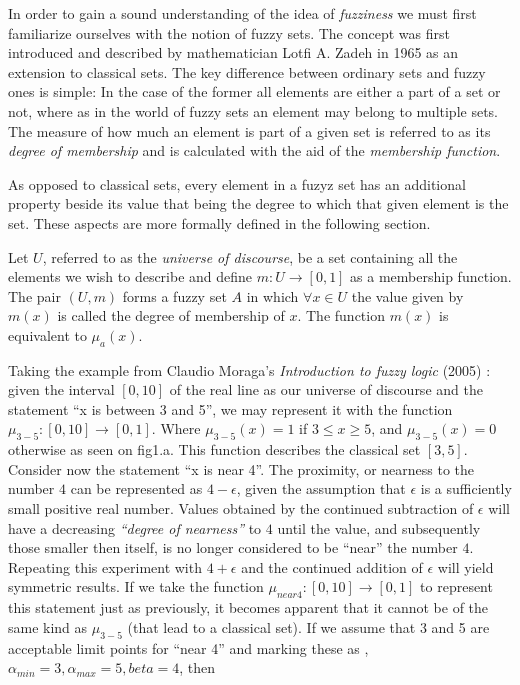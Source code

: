 
In order to gain a sound understanding of the idea of \textit{fuzziness} we must first familiarize ourselves with the notion of fuzzy sets. The concept was first introduced and described by mathematician Lotfi A. Zadeh in 1965 as an extension to classical sets. The key difference between ordinary sets and fuzzy ones is simple: In the case of the former all elements are either a part of a set or not, where as in the world of fuzzy sets an element may belong to multiple sets. The measure of how much an element is part of a given set is referred to as its \textit{degree of membership} and is calculated with the aid of the \textit{membership function}.

As opposed to classical sets, every element in a fuzyz set has an additional property beside its value that being the degree to which that given element is the set. These aspects are more formally defined in the following section.

\begin{definition}
Let $U$, referred to as the \textit{universe of discourse}, be a set containing all the elements we wish to describe and define $m:U \to [0, 1]$ as a membership function. The pair $(U, m) $ forms a fuzzy set $A$ in which $\forall x \in U$ the value given by $m(x)$ is called the degree of membership of $x$. The function $m(x)$ is equivalent to $\mu_{a}(x)$.
\end{definition}

Taking the example from Claudio Moraga's \textit{Introduction to fuzzy logic} (2005) \cite{moraga2005}: given the interval $[0, 10]$ of the real line as our universe of discourse and the statement ``x is between 3 and 5'', we may represent it with the function $\mu_{3-5}:[0, 10] \to [0,1]$. Where $\mu_{3-5}(x) = 1$ if $3 \leq x \geq 5$, and $\mu_{3-5}(x) = 0$ otherwise as seen on fig1.a. This function describes the classical set $[3, 5]$. Consider now the statement ``x is near 4''. The proximity, or nearness to the number $4$ can be represented as $4-\epsilon$, given the assumption that $\epsilon$ is a sufficiently small positive real number. Values obtained by the continued subtraction of $\epsilon$ will have a decreasing \textit{``degree of nearness''} to $4$ until the value, and subsequently those smaller then itself, is no longer considered to be ``near'' the number $4$. Repeating this experiment with $4+\epsilon$ and the continued addition of $\epsilon$ will yield symmetric results. If we take the function $\mu_{near 4} : [0, 10] \to [0, 1]$ to represent this statement just as previously, it becomes apparent that it cannot be of the same kind as $\mu_{3-5}$ (that lead to a classical set). If we assume that 3 and 5 are acceptable limit points for ``near 4” and marking these as , $\alpha_{min} = 3, \alpha_{max} = 5, beta = 4$, then

